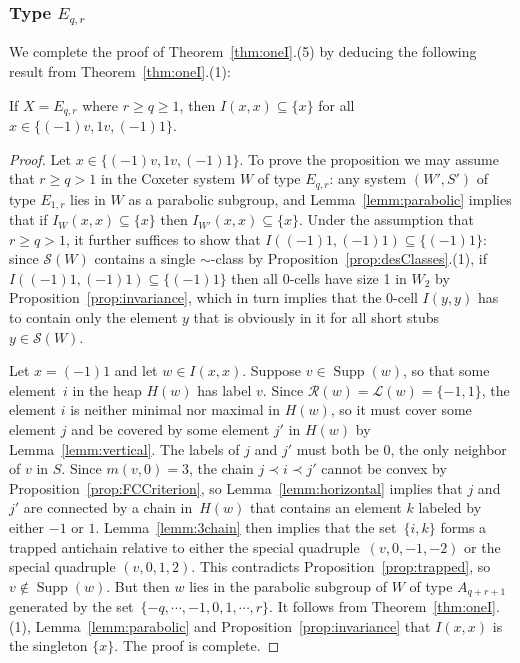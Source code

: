\documentclass[ALCO,Unicode,published]{cedram}
\newcommand{\call}{\mathcal{L}}
\newcommand{\calr}{\mathcal{R}}
\newcommand{\sw}{\mathcal{S}(W)}
\newcommand{\se}{\subseteq}
\DeclareMathOperator{\supp}{\mathrm{Supp}}
\begin{document}
\subsubsection{Type $E_{q,r}$}
We complete the proof of Theorem~\ref{thm:oneI}.(5) by deducing the following result from Theorem~\ref{thm:oneI}.(1):
\begin{prop}
    \label{prop:Eqr} If $X=E_{q,r}$ where $r\ge q\ge 1$, then $I(x,x)\se \{x\}$ for all $x\in \{(-1)v,1v,(-1)1\}$.
\end{prop}
\begin{proof} 
    Let $x\in \{(-1)v, 1v,(-1)1\}$. To prove the proposition we may assume that $r\ge q> 1$ in the
    Coxeter system $W$ of type $E_{q,r}$: any system $(W',S')$ of type $E_{1,r}$ lies in $W$ as a
    parabolic subgroup, and Lemma~\ref{lemm:parabolic} implies that if $I_{W}(x,x)\se\{x\}$ then
    $I_{W'}(x,x)\se \{x\}$. Under the assumption that $r\ge q> 1$, it further suffices to show that
    $I((-1)1,(-1)1)\se\{(-1)1\}$: since $\sw$ contains a single $\sim$-class by
    Proposition~\ref{prop:desClasses}.(1), if $I((-1)1,(-1)1)\se\{(-1)1\}$ then  all 0-cells have size 1 in
    $W_2$ by Proposition~\ref{prop:invariance}, which in turn implies that the 0-cell $I(y,y)$ has to contain
    only the element $y$ that is obviously in it for all short stubs $y\in \sw$.

  Let $x=(-1)1$ and let $w\in I(x,x)$. Suppose $v\in \supp(w)$, so that some element~$i$ in the heap
  $H(w)$ has label $v$. Since $\calr(w)=\call(w)=\{-1,1\}$, the element $i$ is neither minimal nor
  maximal in $H(w)$, so it must cover some element $j$ and be covered by some element $j'$ in $H(w)$
  by Lemma~\ref{lemm:vertical}. The labels of $j$ and $j'$ must both be $0$, the only neighbor of $v$ in
  $S$. Since $m(v,0)=3$, the chain $j\prec i\prec j'$ cannot be convex by Proposition~\ref{prop:FCCriterion},
  so Lemma~\ref{lemm:horizontal} implies that $j$ and $j'$ are connected by a chain in~$H(w)$ that
  contains an element $k$ labeled by either $-1$ or $1$.  Lemma~\ref{lemm:3chain} then implies that the
  set~$\{i,k\}$ forms a trapped antichain relative to either the special quadruple~$(v,0,-1,-2)$ or
  the special quadruple $(v,0,1,2)$.  This contradicts Proposition~\ref{prop:trapped}, so~$v\notin\supp(w)$.
  But then $w$ lies in the parabolic subgroup of $W$ of type $A_{q+r+1}$ generated by the 
  set~$\{-q,\cdots,-1,0,1,\cdots,r\}$. It follows from Theorem~\ref{thm:oneI}.(1), Lemma~\ref{lemm:parabolic} and
  Proposition~\ref{prop:invariance} that $I(x,x)$ is the singleton $\{x\}$. The proof is complete. 
\end{proof}
 
\end{document}
